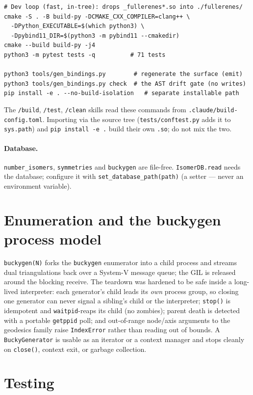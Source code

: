 \documentclass[11pt]{article}
\newcommand{\code}[1]{\lstinline[style=py]!#1!}
\begin{document}
\begin{lstlisting}[style=sh]
# Dev loop (fast, in-tree): drops _fullerenes*.so into ./fullerenes/
cmake -S . -B build-py -DCMAKE_CXX_COMPILER=clang++ \
  -DPython_EXECUTABLE=$(which python3) \
  -Dpybind11_DIR=$(python3 -m pybind11 --cmakedir)
cmake --build build-py -j4
python3 -m pytest tests -q          # 71 tests

python3 tools/gen_bindings.py        # regenerate the surface (emit)
python3 tools/gen_bindings.py check  # the AST drift gate (no writes)
pip install -e . --no-build-isolation   # separate installable path
\end{lstlisting}
The \code{/build}, \code{/test}, \code{/clean} skills read these commands from
\texttt{.claude/build-config.toml}. Importing via the source tree (\texttt{tests/conftest.py}
adds it to \texttt{sys.path}) and \code{pip install -e .} build their own \texttt{.so};
do not mix the two.

\paragraph{Database.} \code{number_isomers}, \code{symmetries} and \code{buckygen} are
file-free. \code{IsomerDB.read} needs the database; configure it with
\code{set_database_path(path)} (a setter --- never an environment variable).

\section{Enumeration and the buckygen process model}
\label{sec:bucky}

\code{buckygen(N)} forks the \texttt{buckygen} enumerator into a child process and streams
dual triangulations back over a System-V message queue; the GIL is released around the
blocking receive. The teardown was hardened to be safe inside a long-lived interpreter:
each generator's child leads its \emph{own} process group, so closing one generator can
never signal a sibling's child or the interpreter; \code{stop()} is idempotent and
\code{waitpid}-reaps its child (no zombies); parent death is detected with a portable
\code{getppid} poll; and out-of-range node/axis arguments to the geodesics family raise
\texttt{IndexError} rather than reading out of bounds. A \code{BuckyGenerator} is usable as
an iterator or a context manager and stops cleanly on \code{close()}, context exit, or
garbage collection.

\section{Testing}
\label{sec:test}
\end{document}
